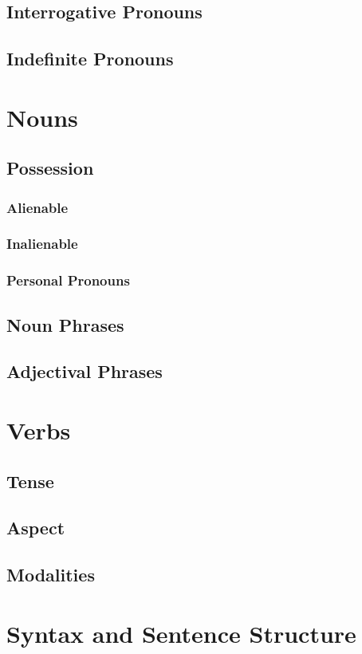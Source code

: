 \documentclass[10pt]{article}
\begin{document}
	\subsection{Interrogative Pronouns}
	\subsection{Indefinite Pronouns}
\section{Nouns}
	\subsection{Possession}
		\subsubsection{Alienable}
		\subsubsection{Inalienable}
		\subsubsection{Personal Pronouns}
	\subsection{Noun Phrases}
	\subsection{Adjectival Phrases}
\section{Verbs}
	\subsection{Tense}
	\subsection{Aspect}
	\subsection{Modalities}
\section{Syntax and Sentence Structure}
		


\pagebreak

\begin{thebibliography}{99}
	
    
\end{thebibliography}
\end{document}
